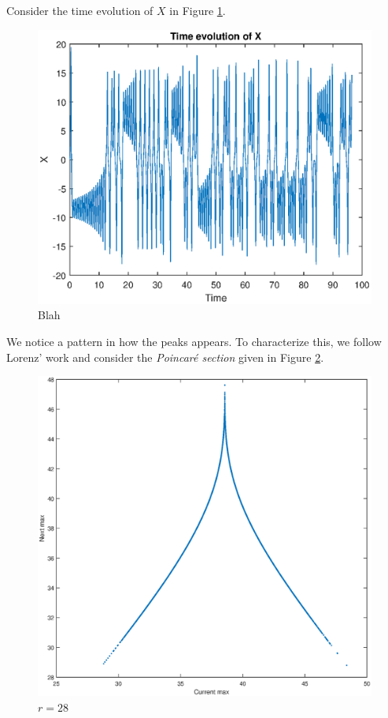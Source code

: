 \documentclass[twocolumn,amsmath,amssymb,aps]{revtex4}
\begin{document}
Consider the time evolution of $X$ in Figure \ref{fig:time_evolve}.
\begin{figure}[!htb]
	\centering
	\includegraphics[scale=0.5]{time_evolve}
	\caption{Blah}
	\label{fig:time_evolve}
\end{figure}
We notice a pattern in how the peaks appears. To characterize this, we follow Lorenz' work and consider the \textit{Poincar\'{e} section} given in Figure \ref{fig:poincare_1}.
\begin{figure}[!htb]
	\centering
	\includegraphics[scale=0.4]{Poincare_section}
	\caption{$r = 28$}
	\label{fig:poincare_1}
\end{figure}
\end{document}
